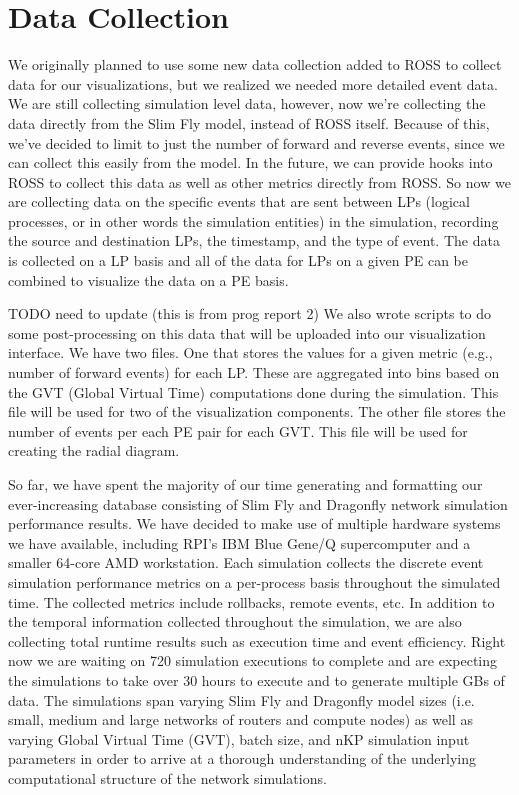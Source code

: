\documentclass{acm_proc_article-sp}
\begin{document}
\section{Data Collection}
We originally planned to use some new data collection added to ROSS to collect data for our visualizations, but we realized we needed more detailed event data. We are still collecting simulation level data, however, now we're collecting the data directly from the Slim Fly model, instead of ROSS itself.  Because of this, we've decided to limit to just the number of forward and reverse events, since we can collect this easily from the model.  In the future, we can provide hooks into ROSS to collect this data as well as other metrics directly from ROSS.  So now we are collecting data on the specific events that are sent between LPs (logical processes, or in other words the simulation entities) in the simulation, recording the source and destination LPs, the timestamp, and the type of event.   The data is collected on a LP basis and all of the data for LPs on a given PE can be combined to visualize the data on a PE basis.  

\color{red} TODO need to update (this is from prog report 2) \color{black}
We also wrote scripts to do some post-processing on this data that will be uploaded into our visualization interface.  We have two files.  One that stores the values for a given metric (e.g., number of forward events) for each LP.  These are aggregated into bins based on the GVT (Global Virtual Time) computations done during the simulation.  This file will be used for two of the visualization components. The other file stores the number of events per each PE pair for each GVT.  This file will be used for creating the radial diagram.

\color{red}
So far, we have spent the majority of our time generating and formatting our ever-increasing database consisting of Slim Fly and Dragonfly network simulation performance results. We have decided to make use of multiple hardware systems we have available, including RPI's IBM Blue Gene/Q supercomputer and a smaller 64-core AMD workstation. Each simulation collects the discrete event simulation performance metrics on a per-process basis throughout the simulated time. The collected metrics include rollbacks, remote events, etc. In addition to the temporal information collected throughout the simulation, we are also collecting total runtime results such as execution time and event efficiency. Right now we are waiting on 720 simulation executions to complete and are expecting the simulations to take over 30 hours to execute and to generate multiple GBs of data. The simulations span varying Slim Fly and Dragonfly model sizes (i.e. small, medium and large networks of routers and compute nodes) as well as varying Global Virtual Time (GVT), batch size, and nKP simulation input parameters in order to arrive at a thorough understanding of the underlying computational structure of the network simulations. 
\color{black}
\end{document}
